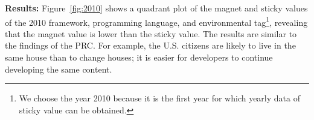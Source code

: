 \documentclass[english,preprint,JIP,technote]{ipsj}
\begin{document}





\noindent \textbf{Results:}
Figure~\ref{fig:2010} shows a quadrant plot of the magnet and sticky values ​​of the 2010 framework, programming language, and environmental tag\footnote{We choose the year 2010 because it is the first year for which yearly data of sticky value can be obtained.}, revealing that the magnet value is lower than the sticky value. The results are similar to the findings of the PRC. For example, the U.S. citizens are likely to live in the same house than to change houses; it is easier for developers to continue developing the same content.
 
\end{document}
